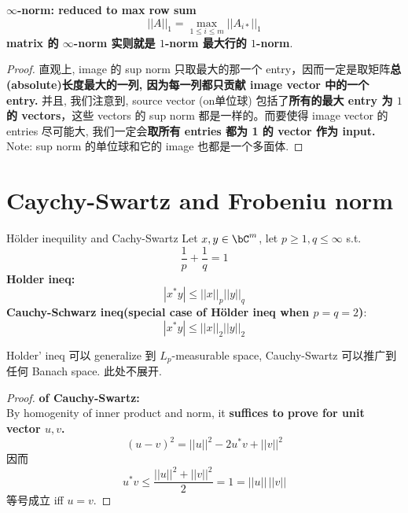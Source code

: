 \begin{example}
\begin{proposition}{\textbf{$\infty$-norm: reduced to max row sum}}
    \begin{equation}
    ||A||_1 =  \max_{1 \leq i \leq m}  ||A_{i*}||_1
\end{equation}
\textbf{matrix 的 $\infty$-norm 实则就是 $1$-norm 最大行的 $1$-norm}.\\
\end{proposition}
\begin{proof}
直观上, image 的 sup norm 只取最大的那一个 entry，因而一定是取矩阵\textbf{总(absolute)长度最大的一列, 因为每一列都只贡献 image vector 中的一个 entry. }
并且, 我们注意到, source vector (on单位球) 包括了\textbf{所有的最大 entry 为 $1$ 的 vectors}，这些 vectors 的 sup norm 都是一样的。而要使得 image vector 的 entries 尽可能大, 我们一定会\textbf{取所有 entries 都为 1 的 vector 作为 input.}
Note: sup norm 的单位球和它的 image 也都是一个多面体.

\end{proof}

\end{example}




\section{Caychy-Swartz and Frobeniu norm}

\begin{theorem}{Hölder inequility and Cachy-Swartz}
Let $x,y \in \bC^m$, let $p\geq 1, q \leq \infty$ s.t. 
$$
\frac{1}{p} + \frac{1}{q} = 1
$$
\textbf{Holder ineq:}
\begin{equation}
    |x^*y| \leq ||x||_p ||y||_q
\end{equation}
\textbf{Cauchy-Schwarz ineq(special case of Hölder ineq when $p=q=2$)}:
\begin{equation}
    |x^*y| \leq ||x||_2 ||y||_2
\end{equation}

\end{theorem}
\begin{remark}
    Holder' ineq 可以 generalize 到 $L_p$-measurable space, Cauchy-Swartz 可以推广到任何 Banach space. 此处不展开.
\end{remark}
\begin{proof}
 \textbf{of Cauchy-Swartz:  } \\
 By homogenity of inner product and norm, it \textbf{suffices to prove for unit vector $u,v$.}\\
 $$(u-v)^2 = ||u||^2 -2u^* v + ||v||^2 $$
 因而
 $$
 u^*v \leq \frac{||u||^2 + ||v||^2}{2} = 1 = ||u|| \, ||v||
 $$
 等号成立 iff $u =v$.
\end{proof}


